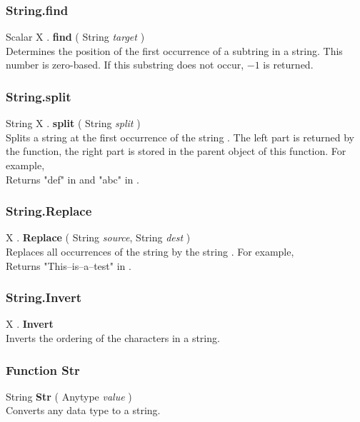 \subsubsection{String.find \label{F:String:find}}
Scalar X . \textbf{find} ( String \textit{target} ) \\
Determines the position of the first occurrence of a subtring  in a string. This number is zero-based. If this substring does not occur, $-1$ is returned.

\subsubsection{String.split \label{F:String:split}}
String X . \textbf{split} ( String \textit{split} ) \\
Splits a string at the first occurrence of the string . The left part is returned by the function, the right part is stored in the parent object of this function. For example, \\
Returns "def" in  and "abc" in .

\subsubsection{String.Replace \label{F:String:Replace}}
X . \textbf{Replace} ( String \textit{source}, String \textit{dest} ) \\
Replaces all occurrences of the string  by the string .
For example, \\
Returns "This--is--a--test" in .


\subsubsection{String.Invert \label{F:String:Invert}}
X . \textbf{Invert} \\
Inverts the ordering of the characters in a string.

\subsubsection{Function Str \label{F:Str}}
String \textbf{Str} ( Anytype \textit{value} ) \\
Converts any data type to a string.

